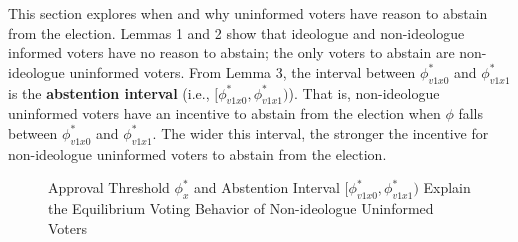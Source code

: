\documentclass[letterpaper, 12pt]{article}
\begin{document}
    \par This section explores when and why uninformed voters have reason to abstain from the election. Lemmas 1 and 2 show that ideologue and non-ideologue informed voters have no reason to abstain; the only voters to abstain are non-ideologue uninformed voters. From Lemma 3, the interval between $\phi^*_{v1x0}$ and $\phi^*_{v1x1}$ is the \textbf{abstention interval} (i.e., $[\phi^*_{v1x0},  \phi^*_{v1x1})$). That is, non-ideologue uninformed voters have an incentive to abstain from the election when $\phi$ falls between $\phi^*_{v1x0}$ and $\phi^*_{v1x1}$. The wider this interval, the stronger the incentive for non-ideologue uninformed voters to abstain from the election.
    
    \begin{figure}[t!]
        \caption{Approval Threshold $\phi^*_x$ and Abstention Interval $[\phi^*_{v1x0},  \phi^*_{v1x1})$ Explain the Equilibrium Voting Behavior of Non-ideologue Uninformed Voters}
        \label{fig:abint}
        \begin{center}
        \end{center}
        \begin{center}

\end{center}
\end{figure}
\end{document}
